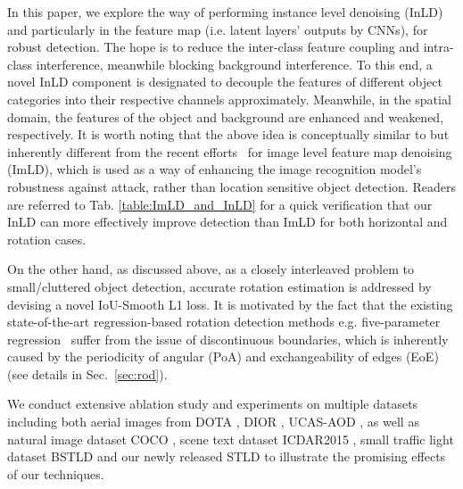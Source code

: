 \documentclass[10pt,journal,compsoc]{IEEEtran}
\begin{document}
In this paper, we explore the way of performing instance level denoising (InLD) and particularly in the feature map (i.e. latent layers' outputs by CNNs), for robust detection. The hope is to reduce the inter-class feature coupling and intra-class interference, meanwhile blocking background interference. To this end, a novel InLD component is designated to decouple the features of different object categories into their respective channels approximately. Meanwhile, in the spatial domain, the features of the object and background are enhanced and weakened, respectively. It is worth noting that the above idea is conceptually similar to but inherently different from the recent efforts~\cite{xie2019feature, cho2020dapas} for image level feature map denoising (ImLD), which is used as a way of enhancing the image recognition model's robustness against attack, rather than location sensitive object detection. Readers are referred to Tab. \ref{table:ImLD_and_InLD} for a quick verification that our InLD can more effectively improve detection than ImLD for both horizontal and rotation cases.









On the other hand, as discussed above, as a closely interleaved problem to small/cluttered object detection, accurate rotation estimation is addressed by devising a novel IoU-Smooth L1 loss. It is motivated by the fact that the existing state-of-the-art regression-based rotation detection methods e.g. five-parameter regression~\cite{azimi2018towards, ding2018learning,  yang2021r3det, zhang2019cad} suffer from the issue of discontinuous boundaries, which is inherently caused by the periodicity of angular (PoA) and exchangeability of edges (EoE) \cite{yang2020arbitrary} (see details in Sec.~\ref{sec:rod}).



We conduct extensive ablation study and experiments on multiple datasets including both aerial images from DOTA \cite{xia2018dota}, DIOR \cite{li2020object}, UCAS-AOD \cite{li2019feature}, as well as natural image dataset COCO \cite{lin2014microsoft}, scene text dataset ICDAR2015 \cite{karatzas2015icdar}, small traffic light dataset BSTLD \cite{behrendt2017deep} and our newly released STLD to illustrate the promising effects of our techniques. 
\end{document}
